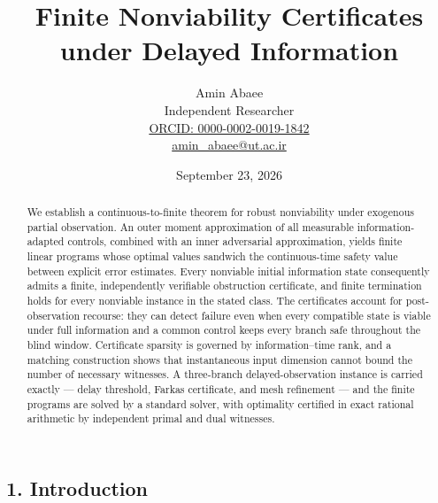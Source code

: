 \documentclass[10pt,twocolumn]{article}
\theoremstyle{definition}
\begin{document}
\title{Finite Nonviability Certificates under Delayed Information}
\author{Amin Abaee\\[0.35em]
{\small Independent Researcher}\\[0.55em]
{\small\href{https://orcid.org/0000-0002-0019-1842}{ORCID: 0000-0002-0019-1842}}\\[0.3em]
{\small\href{mailto:amin\_abaee@ut.ac.ir}{amin\_abaee@ut.ac.ir}}}
\date{September 23, 2026}
\maketitle

\begin{abstract}

We establish a continuous-to-finite theorem for robust nonviability under
exogenous partial observation. An outer moment approximation of all measurable
information-adapted controls, combined with an inner adversarial approximation,
yields finite linear programs whose optimal values sandwich the continuous-time
safety value between explicit error estimates. Every nonviable initial
information state consequently admits a finite, independently verifiable
obstruction certificate, and finite termination holds for every nonviable
instance in the stated class. The certificates account for post-observation
recourse: they can detect failure even when every compatible state is viable
under full information and a common control keeps every branch safe throughout
the blind window. Certificate sparsity is governed by information--time rank,
and a matching construction shows that instantaneous input dimension cannot
bound the number of necessary witnesses. A three-branch delayed-observation
instance is carried exactly --- delay threshold, Farkas certificate, and mesh
refinement --- and the finite programs are solved by a standard solver, with
optimality certified in exact rational arithmetic by independent primal and
dual witnesses.

\end{abstract}

\subsection{1. Introduction}\label{introduction}
\end{document}
